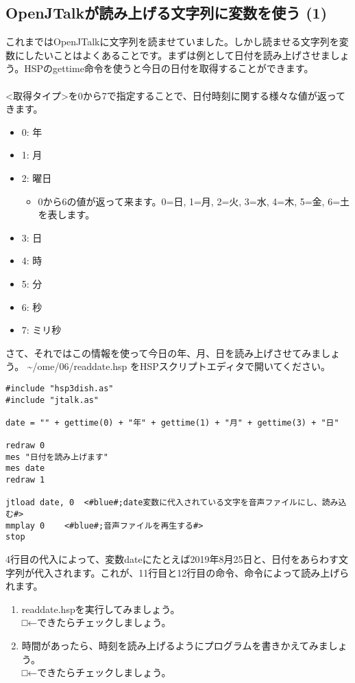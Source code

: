 \subsection{OpenJTalkが読み上げる文字列に変数を使う (1)}
これまではOpenJTalkに文字列を読ませていました。しかし読ませる文字列を変数にしたいことはよくあることです。まずは例として日付を読み上げさせましょう。HSPのgettime命令を使うと今日の日付を取得することができます。\\
\\
<取得タイプ>を0から7で指定することで、日付時刻に関する様々な値が返ってきます。
\begin{itemize}
\item 0: 年
\item 1: 月
\item 2: 曜日
\begin{itemize}
 \item 0から6の値が返って来ます。0=日, 1=月, 2=火, 3=水, 4=木, 5=金, 6=土 を表します。
\end{itemize}
\item 3: 日
\item 4: 時
\item 5: 分
\item 6: 秒
\item 7: ミリ秒
\end{itemize}
さて、それではこの情報を使って今日の年、月、日を読み上げさせてみましょう。 \textasciitilde /ome/06/readdate.hsp をHSPスクリプトエディタで開いてください。\\

\begin{lstlisting}[caption=readdate.hsp,label=readdate.hsp]
#include "hsp3dish.as"
#include "jtalk.as"

date = "" + gettime(0) + "年" + gettime(1) + "月" + gettime(3) + "日"

redraw 0
mes "日付を読み上げます"
mes date
redraw 1

jtload date, 0	<#blue#;date変数に代入されている文字を音声ファイルにし、読み込む#>
mmplay 0	<#blue#;音声ファイルを再生する#>
stop
\end{lstlisting}

4行目の代入によって、変数dateにたとえば2019年8月25日と、日付をあらわす文字列が代入されます。これが、11行目と12行目の命令、命令によって読み上げられます。\\

\begin{tcolorbox}[title=\useOmetoi]
\begin{enumerate}
\item readdate.hspを実行してみましょう。\\□←できたらチェックしましょう。
\item 時間があったら、時刻を読み上げるようにプログラムを書きかえてみましょう。\\□←できたらチェックしましょう。
\end{enumerate}
\end{tcolorbox}
